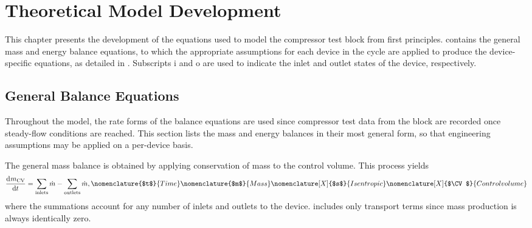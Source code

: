 \chapter{Theoretical Model Development} \label{cha:modeldev}
This chapter presents the development of the equations used to model 
the compressor test block from first principles. 
 contains the general mass and energy balance equations, 
to which the appropriate assumptions for each device in the cycle are applied 
to produce the device-specific equations, as detailed in . 
Subscripts $\text{i}$ and $\text{o}$ are used to indicate 
the inlet and outlet states of the device, respectively. 

\section{General Balance Equations} \label{sec:GenBal}
Throughout the model, the rate forms of the balance equations are used 
since compressor test data from the block are recorded once steady-flow conditions are reached. 
This section lists the mass and energy balances in their most general form, 
so that engineering assumptions may be applied on a per-device basis.

The general mass balance is obtained by 
applying conservation of mass to the control volume. 
This process yields
\begin{equation}
	\dod{m_\CV}{t} = \sum_{\text{inlets}}{\dot{m}} - \sum_{\text{outlets}}{\dot{m}},
  \label{eqn:GenMass}
	\nomenclature{$t$}{Time\nomunit{\second}} \nomenclature{$m$}{Mass\nomunit{\kilogram}} 
	\nomenclature[X]{$s$}{Isentropic} \nomenclature[X]{$\CV$}{Control volume}
\end{equation}
where the summations account for any number of inlets and outlets to the device.
 includes only transport terms since mass production is always identically zero.

